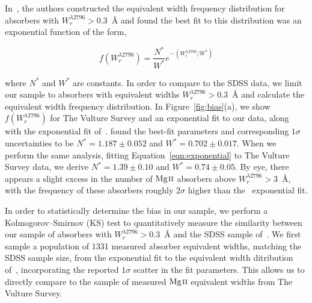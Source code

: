 \documentclass[iop,apj,numberedappendix,appendixfloats,twocolappendix]{emulateapj}
\begin{document}
In~\cite{Nestor2005}, the authors constructed the equivalent width frequency distribution for absorbers with $W_r^{\lambda2796} > 0.3$~{\AA} and found the best fit to this distribution was an exponential function of the form,

\begin{equation}
f(W_r^{\lambda2796}) = \frac{N^*}{W^*} e^{-\,\left(W_r^{\lambda2796} / W^*\right)}
\label{eqn:exponential}
\end{equation}

\noindent where $N^*$ and $W^*$ are constants. In order to compare to the SDSS data, we limit our sample to absorbers with equivalent widths $W_r^{\lambda2796} > 0.3$~{\AA} and calculate the equivalent width frequency distribution. In Figure~\ref{fig:bias}(a), we show $f(W_r^{\lambda2796})$ for The Vulture Survey and an exponential fit to our data, along with the exponential fit of~\cite{Nestor2005}. \cite{Nestor2005} found the best-fit parameters and corresponding $1\sigma$ uncertainties to be $N^* = 1.187 \pm 0.052$ and $W^* = 0.702 \pm 0.017$. When we perform the same analysis, fitting Equation~\ref{eqn:exponential} to The Vulture Survey data, we derive $N^* = 1.39 \pm 0.10$ and $W^* = 0.74 \pm 0.05$. By eye, there appears a slight excess in the number of ${\hbox{{\rm Mg}\kern 0.1em{\sc ii}}}$ absorbers above $W_r^{\lambda2796} > 3$~{\AA}, with the frequency of these absorbers roughly $2\sigma$ higher than the~\cite{Nestor2005} exponential fit.

In order to statistically determine the bias in our sample, we perform a Kolmogorov--Smirnov (KS) test to quantitatively measure the similarity between our sample of absorbers with $W_r^{\lambda2796} > 0.3$~{\AA} and the SDSS sample of~\cite{Nestor2005}. We first sample a population of 1331 measured absorber equivalent widths, matching the SDSS sample size, from the exponential fit to the equivalent width ditribution of~\cite{Nestor2005}, incorporating the reported $1\sigma$ scatter in the fit parameters. This allows us to directly compare to the sample of measured ${\hbox{{\rm Mg}\kern 0.1em{\sc ii}}}$ equivalent widths from The Vulture Survey.
\end{document}
